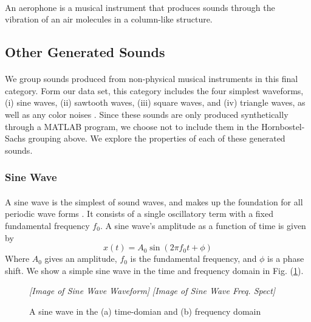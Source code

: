 \documentclass[12pt,letterpaper]{article}
\begin{document}
\paragraph*{}An aerophone is a musical instrument that produces sounds through the vibration of an air molecules in a column-like structure.


\subsection{Other Generated Sounds}
\label{subsec-Generated}

\paragraph*{}We group sounds produced from non-physical musical instruments in this final category. Form our data set, this category includes the four simplest waveforms, (i) sine waves, (ii) sawtooth waves, (iii) square waves, and (iv) triangle waves, as well as any color noises \cite{White}. Since these sounds are only produced synthetically through a MATLAB program, we choose not to include them in the Hornbostel-Sachs grouping above. We explore the properties of each of these generated sounds.


\subsubsection{Sine Wave}

\paragraph*{}A sine wave is the simplest of sound waves, and makes up the foundation for all periodic wave forms \cite{White,Virtanen}. It consists of a single oscillatory term with a fixed fundamental frequency $f_0$. A sine wave's amplitude as a function of time is given by 
\begin{equation}
\label{eqn-SineWave}
x(t) = A_0 \sin(2\pi f_0 t + \phi)
\end{equation}
Where $A_0$ gives an amplitude, $f_0$ is the fundamental frequency, and $\phi$ is a phase shift. We show a simple sine wave in the time and frequency domain in Fig. (\ref{fig-SineWave}).

\begin{figure}[h]
\begin{center}
	\textit{[Image of Sine Wave Waveform]}
	\textit{[Image of Sine Wave Freq. Spect]}
\end{center}
\caption{A sine wave in the (a) time-domian and (b) frequency domain}
\label{fig-SineWave}
\end{figure} 
\end{document}
